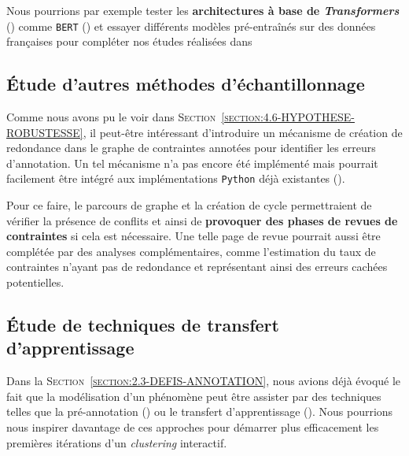 		Nous pourrions par exemple tester les \textbf{architectures à base de \textit{Transformers}} (\cite{uszkoreit:2017:transformer-novel-neural}) comme \texttt{BERT} (\cite{devlin-etal:2019:bert-pretraining-deep}) et essayer différents modèles pré-entraînés sur des données françaises pour compléter nos études réalisées dans \cite{schild:2021:cognitivefactory-interactiveclusteringcomparativestudy}
	
	
	\subsection{Étude d'autres méthodes d'échantillonnage}
	\label{section:4.7.3-HYPOTHESES-NON-VERIFIEES-ECHANTILLONNAGE}
	
		Comme nous avons pu le voir dans \textsc{Section~\ref{section:4.6-HYPOTHESE-ROBUSTESSE}}, il peut-être intéressant d'introduire un mécanisme de création de redondance dans le graphe de contraintes annotées pour identifier les erreurs d'annotation.
		Un tel mécanisme n'a pas encore été implémenté mais pourrait facilement être intégré aux implémentations \texttt{Python} déjà existantes (\cite{schild:2022:cognitivefactory-interactiveclustering}).
		
		Pour ce faire, le parcours de graphe et la création de cycle permettraient de vérifier la présence de conflits et ainsi de \textbf{provoquer des phases de revues de contraintes} si cela est nécessaire.
		Une telle page de revue pourrait aussi être complétée par des analyses complémentaires, comme l'estimation du taux de contraintes n'ayant pas de redondance et représentant ainsi des erreurs cachées potentielles.
	
	
	\subsection{Étude de techniques de transfert d'apprentissage}
	\label{section:4.7.4-HYPOTHESES-NON-VERIFIEES-TRANSFERT-APPRENTISSAGE}
	
		Dans la \textsc{Section~\ref{section:2.3-DEFIS-ANNOTATION}}, nous avions déjà évoqué le fait que la modélisation d'un phénomène peut être assister par des techniques telles que la pré-annotation (\cite{dandapat-etal:2009:complex-linguistic-annotation}) ou le transfert d'apprentissage (\cite{zhuang-etal:2021:comprehensive-survey-transfer}).
		Nous pourrions nous inspirer davantage de ces approches pour démarrer plus efficacement les premières itérations d'un \textit{clustering} interactif.
	
